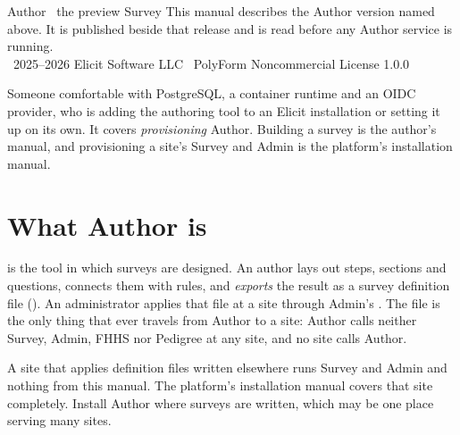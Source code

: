 \documentclass[11pt, a4paper]{article}
\begin{document}
%
  {Author \textperiodcentered\ the preview Survey}%
  {This manual describes the Author version named above. It is published beside that release and is read before any Author service is running.\\[0.5em] \textcopyright\ 2025--2026 Elicit Software LLC \textperiodcentered\ PolyForm Noncommercial License 1.0.0}

\setcounter{page}{1}
\elicitContents

\vfill

\begin{elicitnote}
Someone comfortable with PostgreSQL, a container runtime and an
OIDC provider, who is adding the authoring tool to an Elicit installation or setting it up on
its own. It covers \emph{provisioning} Author. Building a survey is the author's manual, and
provisioning a site's Survey and Admin is the platform's installation manual.
\end{elicitnote}

\clearpage
{}
\setcounter{page}{1}

\section{What Author is}
\label{sec:what}

 is the tool in which surveys are designed. An author lays out steps, sections and
questions, connects them with rules, and \emph{exports} the result as a survey definition
file (). An administrator applies that file at a site through Admin's
. The file is the only thing that ever travels from Author to a
site: Author calls neither Survey, Admin, FHHS nor Pedigree at any site, and no site calls
Author.

\begin{elicitnote}
A site that applies definition files written elsewhere runs Survey and Admin and nothing
from this manual. The platform's installation manual covers that site completely. Install
Author where surveys are written, which may be one place serving many sites.
\end{elicitnote}
\end{document}
